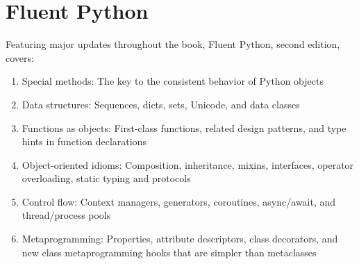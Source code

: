 		\clearpage
		\section{Fluent Python}
		\label{sec:fluent-python}
		\begin{inparadesc}
			\item \betteread
			\item \nearonethpages
			\item {}
		\end{inparadesc}
		\vspace{3mm}
		
		
		
		
		\noindent Featuring major updates throughout the book, Fluent Python, second edition, covers:
		\begin{enumerate}
			\item Special methods: The key to the consistent behavior of Python objects
			\item Data structures: Sequences, dicts, sets, Unicode, and data classes
			\item Functions as objects: First-class functions, related design patterns, and type hints in function declarations
			\item Object-oriented idioms: Composition, inheritance, mixins, interfaces, operator overloading, static typing and protocols
			\item Control flow: Context managers, generators, coroutines, async/await, and thread/process pools
			\item Metaprogramming: Properties, attribute descriptors, class decorators, and new class metaprogramming hooks that are simpler than metaclasses
		\end{enumerate}
	
